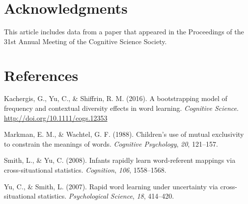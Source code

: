 \documentclass[man,floatsintext]{apa6}
\begin{document}
\hypertarget{acknowledgments}{%
\section{Acknowledgments}\label{acknowledgments}}

This article includes data from a paper that appeared in the Proceedings of the 31st Annual Meeting of the Cognitive Science Society.

\newpage

\hypertarget{references}{%
\section{References}\label{references}}

\begingroup
\setlength{\parindent}{-0.5in}
\setlength{\leftskip}{0.5in}

\hypertarget{refs}{}
\leavevmode\hypertarget{ref-Kachergis2016}{}%
Kachergis, G., Yu, C., \& Shiffrin, R. M. (2016). A bootstrapping model of frequency and contextual diversity effects in word learning. \emph{Cognitive Science}. \url{http://doi.org/10.1111/cogs.12353}

\leavevmode\hypertarget{ref-Markman1988}{}%
Markman, E. M., \& Wachtel, G. F. (1988). Children's use of mutual exclusivity to constrain the meanings of words. \emph{Cognitive Psychology}, \emph{20}, 121--157.

\leavevmode\hypertarget{ref-Smith2008}{}%
Smith, L., \& Yu, C. (2008). Infants rapidly learn word-referent mappings via cross-situational statistics. \emph{Cognition}, \emph{106}, 1558--1568.

\leavevmode\hypertarget{ref-Yu2007}{}%
Yu, C., \& Smith, L. (2007). Rapid word learning under uncertainty via cross-situational statistics. \emph{Psychological Science}, \emph{18}, 414--420.

\endgroup
\end{document}
